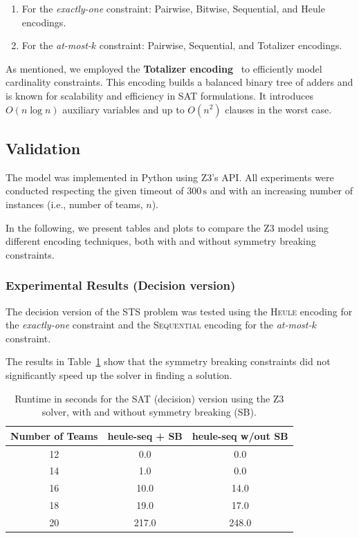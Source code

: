 \documentclass{article}
\begin{document}
\begin{enumerate}
    \item For the \textit{exactly-one} constraint: Pairwise, Bitwise, Sequential, and Heule encodings.
    \item For the \textit{at-most-$k$} constraint: Pairwise, Sequential, and Totalizer encodings.
\end{enumerate}

As mentioned, we employed the \textbf{Totalizer encoding}~\cite{bailleux2003} to efficiently model cardinality constraints. This encoding builds a balanced binary tree of adders and is known for scalability and efficiency in SAT formulations. It introduces $O(n \log n)$ auxiliary variables and up to $O(n^2)$ clauses in the worst case.

\subsection{Validation}
The model was implemented in Python using Z3's API. All experiments were conducted respecting the given timeout of $300\,\mathrm{s}$ and with an increasing number of instances (i.e., number of teams, $n$).

In the following, we present tables and plots to compare the Z3 model using different encoding techniques, both with and without symmetry breaking constraints.

\subsubsection{Experimental Results (Decision version)}
The decision version of the STS problem was tested using the \textsc{Heule} encoding for the \textit{exactly-one} constraint and the \textsc{Sequential} encoding for the \textit{at-most-$k$} constraint.

The results in Table~\ref{tab:sat-results-dec} show that the symmetry breaking constraints did not significantly speed up the solver in finding a solution. 


\begin{table}[H]
\centering
\small %
\caption{Runtime in seconds for the SAT (decision) version using the Z3 solver, with and without symmetry breaking (SB).}
\label{tab:sat-results-dec}
\begin{tabular}{ccc}
\toprule
\textbf{Number of Teams} & \textbf{heule-seq + SB} & \textbf{heule-seq w/out SB} \\
\midrule
12 & 0.0 & 0.0 \\
14 & 1.0 & 0.0 \\
16 & 10.0 & 14.0 \\
18 & 19.0 & 17.0 \\
20 & 217.0 & 248.0 \\
\bottomrule
\end{tabular}
\end{table}
\end{document}
